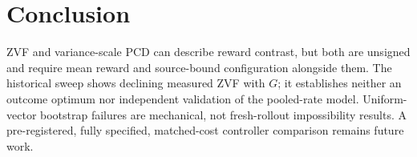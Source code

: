 \section{Conclusion}
ZVF and variance-scale PCD can describe reward contrast, but both are unsigned
and require mean reward and source-bound configuration alongside them.
The historical sweep shows declining measured ZVF with $G$; it establishes
neither an outcome optimum nor independent validation of the pooled-rate
model. Uniform-vector bootstrap failures are mechanical, not fresh-rollout
impossibility results. A pre-registered, fully specified, matched-cost
controller comparison remains future work.
